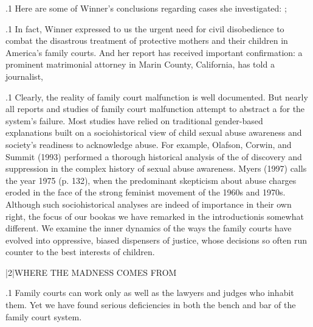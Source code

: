 \documentclass[11pt, twoside]{article}
\begin{document}
{\p.1{%
Here are some of Winner’s conclusions regarding cases she investigated: ; 
}%

\p.1{%
In fact, Winner expressed to us the urgent need for civil disobedience to combat the disastrous treatment of protective mothers and their
children in America’s family courts. And her report has received important confirmation: a prominent matrimonial attorney in Marin County,
California, has told a journalist, 
}%

\p.1{%
Clearly, the reality of family court malfunction is well documented.
But nearly all reports and studies of family court malfunction attempt to
abstract a  for the system’s failure. Most studies have relied
on traditional gender-based explanations built on a sociohistorical view
of child sexual abuse awareness and society’s readiness to acknowledge
abuse. For example, Olafson, Corwin, and Summit (1993) performed a
thorough historical analysis of the  of discovery and suppression
in the complex history of sexual abuse awareness. Myers (1997) calls
the year 1975  (p. 132),
when the predominant skepticism about abuse charges eroded in the
face of the strong feminist movement of the 1960s and 1970s.
Although such sociohistorical analyses are indeed of importance in
their own right, the focus of our book\mdash{}as we have remarked in the
introduction\mdash{}is somewhat different. We examine the inner dynamics
of the ways the family courts have evolved
into oppressive, biased dispensers of justice, whose decisions so often run counter to the best interests of children.
}%


\s|2|{WHERE THE MADNESS COMES FROM}

\p.1{%
\noindent{}Family courts can work only as well as the lawyers and judges who inhabit them. Yet we have found serious deficiencies in both the bench and
bar of the family court system.
}%


}
\end{document}
